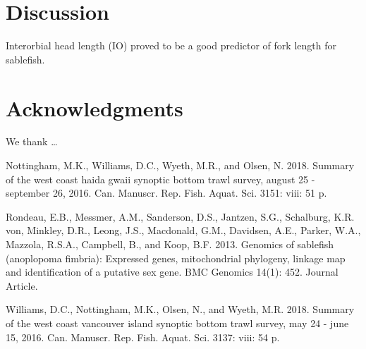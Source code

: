 \documentclass[12pt]{article}\usepackage[]{graphicx}\usepackage[]{color}
\begin{document}
\hypertarget{discussion-1}{%
\section{Discussion}\label{discussion-1}}

Interorbial head length (IO) proved to be a good predictor of fork length for sablefish.

\hypertarget{acknowledgments}{%
\section{Acknowledgments}\label{acknowledgments}}

We thank \ldots{}

\hypertarget{refs}{}
\leavevmode\hypertarget{ref-Nottingham2018}{}%
Nottingham, M.K., Williams, D.C., Wyeth, M.R., and Olsen, N. 2018. Summary of the west coast haida gwaii synoptic bottom trawl survey, august 25 - september 26, 2016. Can. Manuscr. Rep. Fish. Aquat. Sci. 3151: viii: 51 p.

\leavevmode\hypertarget{ref-Rondeau2013}{}%
Rondeau, E.B., Messmer, A.M., Sanderson, D.S., Jantzen, S.G., Schalburg, K.R. von, Minkley, D.R., Leong, J.S., Macdonald, G.M., Davidsen, A.E., Parker, W.A., Mazzola, R.S.A., Campbell, B., and Koop, B.F. 2013. Genomics of sablefish (anoplopoma fimbria): Expressed genes, mitochondrial phylogeny, linkage map and identification of a putative sex gene. BMC Genomics 14(1): 452. Journal Article.

\leavevmode\hypertarget{ref-Williams2018}{}%
Williams, D.C., Nottingham, M.K., Olsen, N., and Wyeth, M.R. 2018. Summary of the west coast vancouver island synoptic bottom trawl survey, may 24 - june 15, 2016. Can. Manuscr. Rep. Fish. Aquat. Sci. 3137: viii: 54 p.
\end{document}
